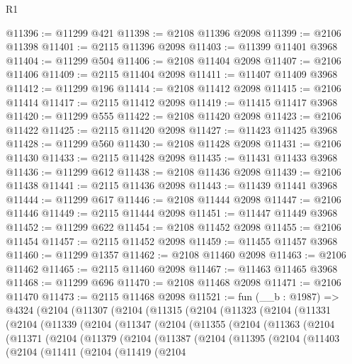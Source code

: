 \begin{lexlean}{R1}
\begin{coremodule}
@11396 := @11299 @421
@11398 := @2108 @11396 @2098
@11399 := @2106 @11398
@11401 := @2115 @11396 @2098
@11403 := @11399 @11401 @3968
@11404 := @11299 @504
@11406 := @2108 @11404 @2098
@11407 := @2106 @11406
@11409 := @2115 @11404 @2098
@11411 := @11407 @11409 @3968
@11412 := @11299 @196
@11414 := @2108 @11412 @2098
@11415 := @2106 @11414
@11417 := @2115 @11412 @2098
@11419 := @11415 @11417 @3968
@11420 := @11299 @555
@11422 := @2108 @11420 @2098
@11423 := @2106 @11422
@11425 := @2115 @11420 @2098
@11427 := @11423 @11425 @3968
@11428 := @11299 @560
@11430 := @2108 @11428 @2098
@11431 := @2106 @11430
@11433 := @2115 @11428 @2098
@11435 := @11431 @11433 @3968
@11436 := @11299 @612
@11438 := @2108 @11436 @2098
@11439 := @2106 @11438
@11441 := @2115 @11436 @2098
@11443 := @11439 @11441 @3968
@11444 := @11299 @617
@11446 := @2108 @11444 @2098
@11447 := @2106 @11446
@11449 := @2115 @11444 @2098
@11451 := @11447 @11449 @3968
@11452 := @11299 @622
@11454 := @2108 @11452 @2098
@11455 := @2106 @11454
@11457 := @2115 @11452 @2098
@11459 := @11455 @11457 @3968
@11460 := @11299 @1357
@11462 := @2108 @11460 @2098
@11463 := @2106 @11462
@11465 := @2115 @11460 @2098
@11467 := @11463 @11465 @3968
@11468 := @11299 @696
@11470 := @2108 @11468 @2098
@11471 := @2106 @11470
@11473 := @2115 @11468 @2098
@11521 := fun (__b : @1987) =>
  @4324
    (@2104
      (@11307
        (@2104
          (@11315
            (@2104
              (@11323
                (@2104
                  (@11331
                    (@2104
                      (@11339
                        (@2104
                          (@11347
                            (@2104
                              (@11355
                                (@2104
                                  (@11363
                                    (@2104
                                      (@11371
                                        (@2104
                                          (@11379
                                            (@2104
                                              (@11387
                                                (@2104
                                                  (@11395
                                                    (@2104
                                                      (@11403
                                                        (@2104
                                                          (@11411
                                                            (@2104
                                                              (@11419
                                                                (@2104

\end{coremodule}
\end{lexlean}
